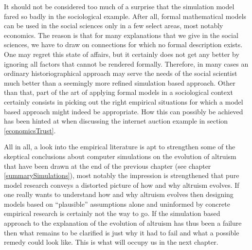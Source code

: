 It should not be considered too much of a surprise that the simulation model
fared so badly in the sociological example. After all, formal mathematical
models can be used in the social sciences only in a few select areas, most
notably economics. The reason is that for many explanations that we give in
the social sciences, we have to draw on connections for which no formal
description exists. One may regret this state of affairs, but it certainly
does not get any better by ignoring all factors that cannot be rendered
formally. Therefore, in many cases an ordinary historiographical approach may
serve the needs of the social scientist much better than a seemingly more
refined simulation based approach. Other than that, part of the art of
applying formal models in a sociological context certainly consists in
picking out the right empirical situations for which a model based approach
might indeed be appropriate. How this can possibly be achieved has been hinted
at when discussing the internet auction example in section
\ref{economicsTrust}.

All in all, a look into the empirical literature is apt to strengthen some of
the skeptical conclusions about computer simulations on the evolution of
altruism that have been drawn at the end of the previous chapter (see chapter
\ref{summarySimulations}), most notably the impression is strengthened that
pure model research conveys a distorted picture of how and why altruism
evolves. If one really wants to understand how and why altruism evolves then
designing models based on ``plausible'' assumptions alone and uninformed by
concrete empirical research is certainly not the way to go. If the simulation
based approach to the explanation of the evolution of altruism has thus been a
failure then what remains to be clarified is just why it had to fail and what
a possible remedy could look like. This is what will occupy us in the next
chapter.
